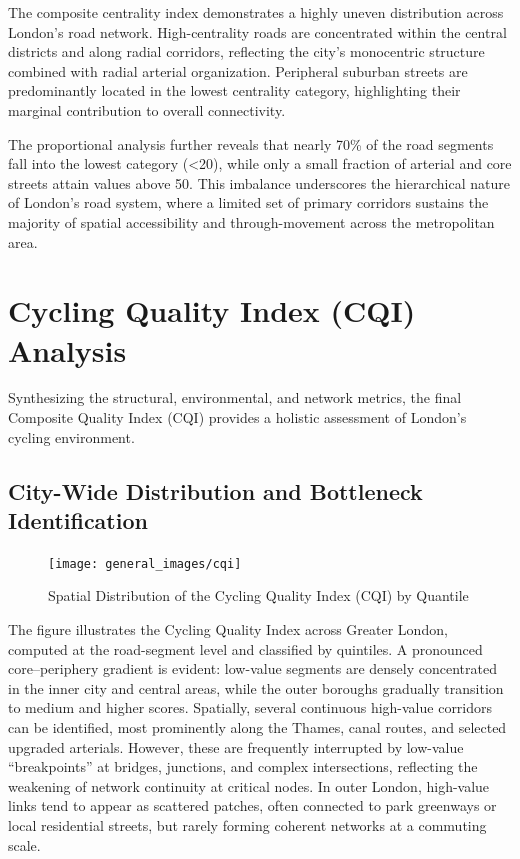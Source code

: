 \documentclass[
  12pt,
  oneside]{book}
\begin{document}
The composite centrality index demonstrates a highly uneven distribution across London's road network. High-centrality roads are concentrated within the central districts and along radial corridors, reflecting the city's monocentric structure combined with radial arterial organization. Peripheral suburban streets are predominantly located in the lowest centrality category, highlighting their marginal contribution to overall connectivity.

The proportional analysis further reveals that nearly 70\% of the road segments fall into the lowest category (\textless20), while only a small fraction of arterial and core streets attain values above 50. This imbalance underscores the hierarchical nature of London's road system, where a limited set of primary corridors sustains the majority of spatial accessibility and through-movement across the metropolitan area.

\section{Cycling Quality Index (CQI) Analysis}\label{cycling-quality-index-cqi-analysis}

Synthesizing the structural, environmental, and network metrics, the final Composite Quality Index (CQI) provides a holistic assessment of London's cycling environment.

\subsection{City-Wide Distribution and Bottleneck Identification}\label{city-wide-distribution-and-bottleneck-identification}

\begin{figure}

{\centering \texttt{[image: general\_images/cqi]} 

}

\caption{Spatial Distribution of the Cycling Quality Index (CQI) by Quantile}\label{fig:cqi}
\end{figure}

The figure illustrates the Cycling Quality Index across Greater London, computed at the road-segment level and classified by quintiles. A pronounced core--periphery gradient is evident: low-value segments are densely concentrated in the inner city and central areas, while the outer boroughs gradually transition to medium and higher scores. Spatially, several continuous high-value corridors can be identified, most prominently along the Thames, canal routes, and selected upgraded arterials. However, these are frequently interrupted by low-value ``breakpoints'' at bridges, junctions, and complex intersections, reflecting the weakening of network continuity at critical nodes. In outer London, high-value links tend to appear as scattered patches, often connected to park greenways or local residential streets, but rarely forming coherent networks at a commuting scale.
\end{document}
